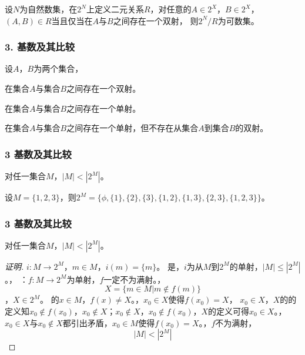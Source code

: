 \documentclass{beamer}
\begin{document}
\begin{CJK*}{UTF8}{gbsn}
\begin{frame}[t]
 设$N$为自然数集，在$2^N$上定义二元关系$R$，对任意的$A\in 2^X$，$B\in 2^X$，$(A,B)\in R$当且仅当在$A$与$B$之间存在一个双射，
 则$2^N/R$为可数集。
\end{frame}

\begin{frame}
  \frametitle{3. 基数及其比较}
  设$A$，$B$为两个集合，
  \begin{description}
  \pause\item[$|A|=|B|:$]在集合$A$与集合$B$之间存在一个双射。
  \pause\item[$|A|\leq |B|:$]在集合$A$与集合$B$之间存在一个单射。
  \pause\item[$|A|< |B|:$]在集合$A$与集合$B$之间存在一个单射，但不存在从集合$A$到集合$B$的双射。
  \end{description}
\end{frame}







\begin{frame}[t]
  \frametitle{3 基数及其比较}
  \begin{Thm}[康托]
    对任一集合$M$，$|M| < |2^{M}|$。
  \end{Thm}
\pause
  设$M=\{1,2,3\}$，则$2^{M}=\{\phi,\{1\},\{2\},\{3\},\{1,2\},\{1,3\},\{2,3\},\{1,2,3\}\}$。
\end{frame}
\begin{frame}[t]
  \frametitle{3 基数及其比较}
  \begin{Thm}[康托]
    对任一集合$M$，$|M| < |2^{M}|$。
  \end{Thm}
  \begin{proof}[证明]\justifying\let\raggedright\justifying
    $i:M\to 2^M$，$m\in M$，\pause$i(m)=\{m\}$。
    是，\pause$i$为从$M$到$2^M$的单射，$|M|\leq |2^M|$。，
    ：$f:M\to 2^M$为单射，$f$一定不为满射。，
    \[X=\{m\in M|m \notin f(m)\}\]，\pause$X\in 2^M$。
    的$x\in M$，\pause$f(x)\neq X$。，$x_0\in X$使得$f(x_0)=X$，
    $x_0\in X$，$X$的的定义知$x_0\notin
    f(x_0)$，$x_0\notin X$；$x_0\notin X$，$x_0\notin f(x_0)$，$X$的定义可得$x_0\in X$。，\pause$x_0\in X$与$x_0\notin X$都引出矛盾，$x_0\in M$使得$f(x_0)=X$。，\pause$f$不为满射，
    \[|M|<|2^M|\]
  \end{proof}
\end{frame}


\end{CJK*}
\end{document}
